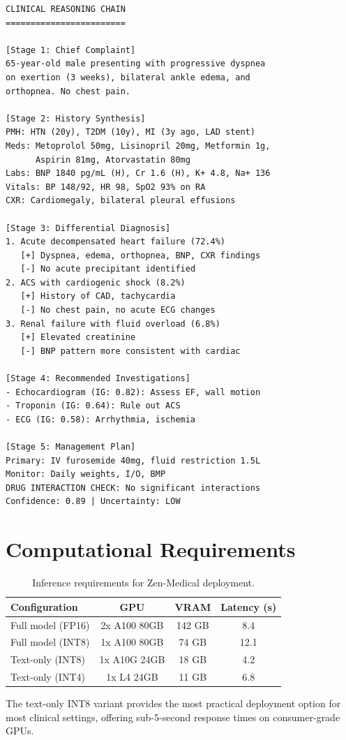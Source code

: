 \documentclass[11pt,a4paper]{article}
\begin{document}
\begin{lstlisting}[caption={Example CRC output for a clinical vignette},language={}]
CLINICAL REASONING CHAIN
========================

[Stage 1: Chief Complaint]
65-year-old male presenting with progressive dyspnea
on exertion (3 weeks), bilateral ankle edema, and
orthopnea. No chest pain.

[Stage 2: History Synthesis]
PMH: HTN (20y), T2DM (10y), MI (3y ago, LAD stent)
Meds: Metoprolol 50mg, Lisinopril 20mg, Metformin 1g,
      Aspirin 81mg, Atorvastatin 80mg
Labs: BNP 1840 pg/mL (H), Cr 1.6 (H), K+ 4.8, Na+ 136
Vitals: BP 148/92, HR 98, SpO2 93% on RA
CXR: Cardiomegaly, bilateral pleural effusions

[Stage 3: Differential Diagnosis]
1. Acute decompensated heart failure (72.4%)
   [+] Dyspnea, edema, orthopnea, BNP, CXR findings
   [-] No acute precipitant identified
2. ACS with cardiogenic shock (8.2%)
   [+] History of CAD, tachycardia
   [-] No chest pain, no acute ECG changes
3. Renal failure with fluid overload (6.8%)
   [+] Elevated creatinine
   [-] BNP pattern more consistent with cardiac

[Stage 4: Recommended Investigations]
- Echocardiogram (IG: 0.82): Assess EF, wall motion
- Troponin (IG: 0.64): Rule out ACS
- ECG (IG: 0.58): Arrhythmia, ischemia

[Stage 5: Management Plan]
Primary: IV furosemide 40mg, fluid restriction 1.5L
Monitor: Daily weights, I/O, BMP
DRUG INTERACTION CHECK: No significant interactions
Confidence: 0.89 | Uncertainty: LOW
\end{lstlisting}

\section{Computational Requirements}
\label{app:compute}

\begin{table}[h]
\centering
\caption{Inference requirements for Zen-Medical deployment.}
\label{tab:compute}
\begin{tabular}{lccc}
\toprule
\textbf{Configuration} & \textbf{GPU} & \textbf{VRAM} & \textbf{Latency (s)} \\
\midrule
Full model (FP16) & 2x A100 80GB & 142 GB & 8.4 \\
Full model (INT8) & 1x A100 80GB & 74 GB & 12.1 \\
Text-only (INT8) & 1x A10G 24GB & 18 GB & 4.2 \\
Text-only (INT4) & 1x L4 24GB & 11 GB & 6.8 \\
\bottomrule
\end{tabular}
\end{table}

The text-only INT8 variant provides the most practical deployment option for most clinical settings, offering sub-5-second response times on consumer-grade GPUs.
\end{document}
